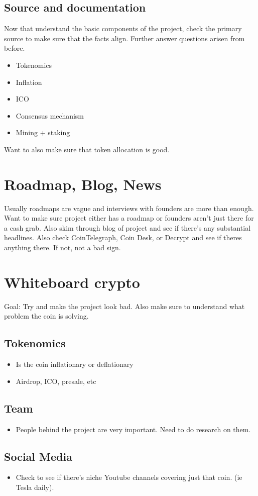 \documentclass{../notes}
\begin{document}
\subsection{Source and documentation}
Now that understand the basic components of the project, check the primary source to make sure that the facts align. Further answer questions arisen from before. 
\begin{itemize}
    \item Tokenomics
    \item Inflation
    \item ICO
    \item Consensus mechanism
    \item Mining + staking
\end{itemize}
Want to also make sure that token allocation is good. 

\section{Roadmap, Blog, News}
Usually roadmaps are vague and interviews with founders are more than enough. Want to make sure project either has a roadmap or founders aren't just there for a cash grab. Also skim through blog of project and see if there's any substantial headlines. Also check CoinTelegraph, Coin Desk, or Decrypt and see if theres anything there. If not, not a bad sign. 

\section{Whiteboard crypto}
Goal: Try and make the project look bad. Also make sure to understand what problem the coin is solving. 

\subsection{Tokenomics}
\begin{itemize}
    \item Is the coin inflationary or deflationary
    \item Airdrop, ICO, presale, etc
\end{itemize}

\subsection{Team}
\begin{itemize}
    \item People behind the project are very important. Need to do research on them. 
\end{itemize}

\subsection{Social Media}
\begin{itemize}
    \item Check to see if there's niche Youtube channels covering just that coin. (ie Tesla daily). 
\end{itemize}
\end{document}
